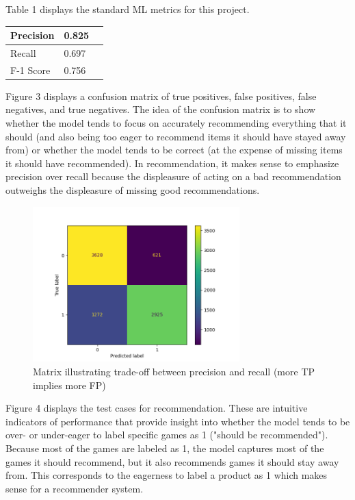 \documentclass[10pt,twocolumn]{article}
\begin{document}
Table 1 displays the standard ML metrics for this project.

\begin{center}
\begin{tabular}{ | m{5em} | m{1cm}| m{1cm} | } 
  \hline
  Precision & 0.825 \\ 
  \hline
  Recall & 0.697 \\ 
  \hline
  F-1 Score & 0.756 \\ 
  \hline
\end{tabular}
\end{center}

Figure 3 displays a confusion matrix of true positives, false positives, false negatives, and true negatives. The idea of the confusion matrix is to show whether the model tends to focus on accurately recommending everything that it should (and also being too eager to recommend items it should have stayed away from) or whether the model tends to be correct (at the expense of missing items it should have recommended). In recommendation, it makes sense to emphasize precision over recall because the displeasure of acting on a bad recommendation outweighs the displeasure of missing good recommendations. 

\begin{figure}[h!]
\includegraphics[width=8cm, height=6cm]{conf_matrix_visual.png}
\centering
\caption{Matrix illustrating trade-off between precision and recall (more TP implies more FP)}
\end{figure}

Figure 4 displays the test cases for recommendation. These are intuitive indicators of performance that provide insight into whether the model tends to be over- or under-eager to label specific games as 1 ("should be recommended"). Because most of the games are labeled as 1, the model captures most of the games it should recommend, but it also recommends games it should stay away from. This corresponds to the eagerness to label a product as 1 which makes sense for a recommender system. 
\end{document}
